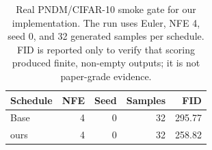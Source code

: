 \begin{table}[t]
  \centering
  \caption{Real PNDM/CIFAR-10 smoke gate for our implementation. The run uses
  Euler, NFE 4, seed 0, and 32 generated samples per
  schedule. FID is reported only to verify that scoring produced finite,
  non-empty outputs; it is not paper-grade evidence.}
  \label{tab:smoke-gate}
  \begin{tabular}{lrrrr}
    \toprule
    Schedule & NFE & Seed & Samples & FID \\
    \midrule
    Base & 4 & 0 & 32 & 295.77 \\
    ours & 4 & 0 & 32 & 258.82 \\
    \bottomrule
  \end{tabular}
\end{table}
